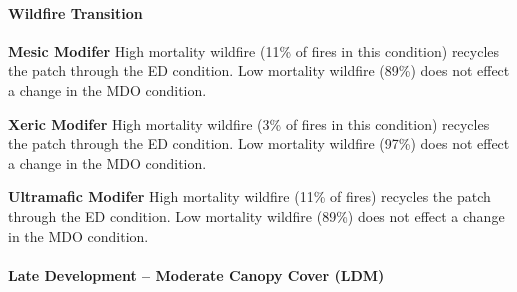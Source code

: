 \paragraph{Wildfire Transition}
\begin{adjustwidth}{2cm}{}
\textbf{Mesic Modifer } High mortality wildfire (11\% of fires in this condition) recycles the patch through the ED condition. Low mortality wildfire (89\%) does not effect a change in the MDO condition. 

\medskip
\noindent \textbf{Xeric Modifer} High mortality wildfire (3\% of fires in this condition) recycles the patch through the ED condition. Low mortality wildfire (97\%) does not effect a change in the MDO condition.

\medskip
\noindent \textbf{Ultramafic Modifer} High mortality wildfire (11\% of fires) recycles the patch through the ED condition. Low mortality wildfire (89\%) does not effect a change in the MDO condition.

\end{adjustwidth}
\noindent\hrulefill

\paragraph{Late Development – Moderate Canopy Cover (LDM)}


